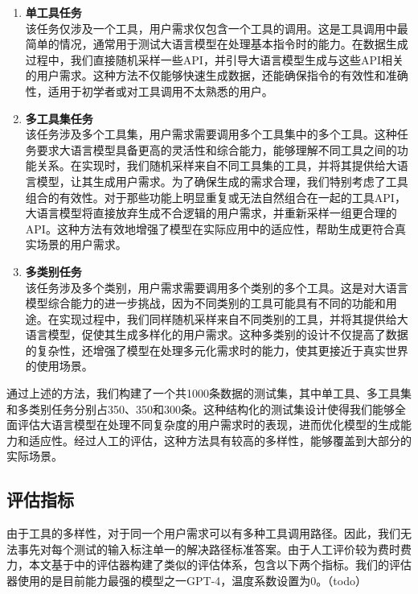 \begin{enumerate}
  \item \textbf{单工具任务} \\
    该任务仅涉及一个工具，用户需求仅包含一个工具的调用。这是工具调用中最简单的情况，通常用于测试大语言模型在处理基本指令时的能力。在数据生成过程中，我们直接随机采样一些API，并引导大语言模型生成与这些API相关的用户需求。这种方法不仅能够快速生成数据，还能确保指令的有效性和准确性，适用于初学者或对工具调用不太熟悉的用户。

  \item \textbf{多工具集任务} \\
    该任务涉及多个工具集，用户需求需要调用多个工具集中的多个工具。这种任务要求大语言模型具备更高的灵活性和综合能力，能够理解不同工具之间的功能关系。在实现时，我们随机采样来自不同工具集的工具，并将其提供给大语言模型，让其生成用户需求。为了确保生成的需求合理，我们特别考虑了工具组合的有效性。对于那些功能上明显重复或无法自然组合在一起的工具API，大语言模型将直接放弃生成不合逻辑的用户需求，并重新采样一组更合理的API。这种方法有效地增强了模型在实际应用中的适应性，帮助生成更符合真实场景的用户需求。

  \item \textbf{多类别任务} \\
    该任务涉及多个类别，用户需求需要调用多个类别的多个工具。这是对大语言模型综合能力的进一步挑战，因为不同类别的工具可能具有不同的功能和用途。在实现过程中，我们同样随机采样来自不同类别的工具，并将其提供给大语言模型，促使其生成多样化的用户需求。这种多类别的设计不仅提高了数据的复杂性，还增强了模型在处理多元化需求时的能力，使其更接近于真实世界的使用场景。

\end{enumerate}

通过上述的方法，我们构建了一个共1000条数据的测试集，其中单工具、多工具集和多类别任务分别占350、350和300条。这种结构化的测试集设计使得我们能够全面评估大语言模型在处理不同复杂度的用户需求时的表现，进而优化模型的生成能力和适应性。经过人工的评估，这种方法具有较高的多样性，能够覆盖到大部分的实际场景。

\subsection{评估指标}
由于工具的多样性，对于同一个用户需求可以有多种工具调用路径。因此，我们无法事先对每个测试的输入标注单一的解决路径标准答案。由于人工评价较为费时费力，本文基于\cite{Tang2023}中的评估器构建了类似的评估体系，包含以下两个指标。我们的评估器使用的是目前能力最强的模型之一GPT-4，温度系数设置为0。（todo）

